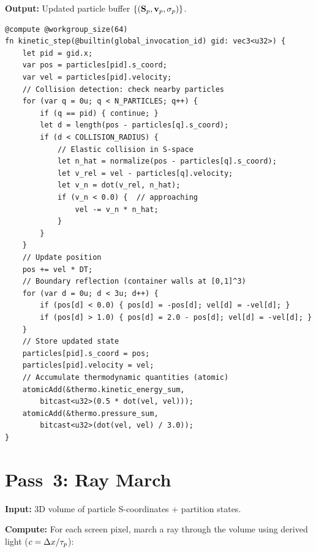 \textbf{Output:} Updated particle buffer $\{(\mathbf{S}_p, \mathbf{v}_p, \sigma_p)\}$.

\begin{lstlisting}[style=wgsl,caption={Pass 2: Kinetic Integration (WGSL pseudocode)}]
@compute @workgroup_size(64)
fn kinetic_step(@builtin(global_invocation_id) gid: vec3<u32>) {
    let pid = gid.x;
    var pos = particles[pid].s_coord;
    var vel = particles[pid].velocity;
    // Collision detection: check nearby particles
    for (var q = 0u; q < N_PARTICLES; q++) {
        if (q == pid) { continue; }
        let d = length(pos - particles[q].s_coord);
        if (d < COLLISION_RADIUS) {
            // Elastic collision in S-space
            let n_hat = normalize(pos - particles[q].s_coord);
            let v_rel = vel - particles[q].velocity;
            let v_n = dot(v_rel, n_hat);
            if (v_n < 0.0) {  // approaching
                vel -= v_n * n_hat;
            }
        }
    }
    // Update position
    pos += vel * DT;
    // Boundary reflection (container walls at [0,1]^3)
    for (var d = 0u; d < 3u; d++) {
        if (pos[d] < 0.0) { pos[d] = -pos[d]; vel[d] = -vel[d]; }
        if (pos[d] > 1.0) { pos[d] = 2.0 - pos[d]; vel[d] = -vel[d]; }
    }
    // Store updated state
    particles[pid].s_coord = pos;
    particles[pid].velocity = vel;
    // Accumulate thermodynamic quantities (atomic)
    atomicAdd(&thermo.kinetic_energy_sum,
        bitcast<u32>(0.5 * dot(vel, vel)));
    atomicAdd(&thermo.pressure_sum,
        bitcast<u32>(dot(vel, vel) / 3.0));
}
\end{lstlisting}

\section{Pass~3: Ray March}
\label{sec:pass3}

\textbf{Input:} 3D volume of particle S-coordinates + partition states.

\textbf{Compute:} For each screen pixel, march a ray through the volume using derived light ($c = \Delta x/\tau_p$):

